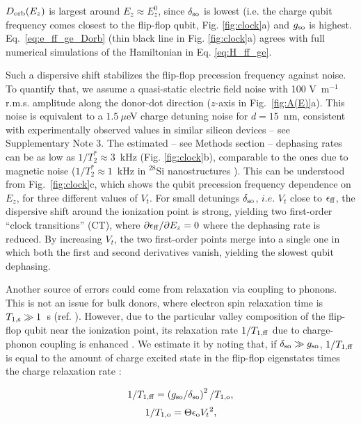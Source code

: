 \documentclass[aps,prb,superscriptaddress,nobibnotes,preprint]{revtex4-1}%
\begin{document}
$D_{\rm orb}(E_z)$ is largest around $E_z\approx E_z^0$, since $\delta_{\rm so}$ is lowest (i.e. the charge qubit frequency comes closest to the flip-flop qubit, Fig. \ref{fig:clock}a) and $g_{\rm so}$ is highest. Eq.~\ref{eq:e_ff_ge_Dorb} (thin black line in Fig. \ref{fig:clock}a) agrees with full numerical simulations of the Hamiltonian in Eq. \ref{eq:H_ff_ge}. 

Such a dispersive shift stabilizes the flip-flop precession frequency against noise. To quantify that, we assume a quasi-static electric field noise with 100 V~m$^{-1}$ r.m.s. amplitude along the donor-dot direction ($z$-axis in Fig.~\ref{fig:A(E)}a). This noise is equivalent to a $1.5~\mu$eV charge detuning noise for $d=15$~nm, consistent with experimentally observed values in similar silicon devices \cite{Freeman2016,Thorgrimsson2016,Harvey-Collard2015} -- see Supplementary Note 3. The estimated -- see Methods section -- dephasing rates can be as low as $1/T_2^{\ast} \approx 3$~kHz (Fig. \ref{fig:clock}b), comparable to the ones due to magnetic noise ($1/T_2^{\ast} \approx 1$~kHz in $^{28}$Si nanostructures \cite{Muhonen2014}). This can be understood from Fig.~\ref{fig:clock}c, which shows the qubit precession frequency dependence on $E_z$, for three different values of $V_t$. For small detunings $\delta_{\rm so}$, $i.e.$ $V_t$ close to $\epsilon_{\rm ff}$, the dispersive shift around the ionization point is strong, yielding two first-order ``clock transitions'' (CT), where $\partial\epsilon_{\rm ff}/\partial E_z=0$ where the dephasing rate is reduced. By increasing $V_t$, the two first-order points merge into a single one in which both the first and second derivatives vanish, yielding the slowest qubit dephasing.

Another source of errors could come from relaxation via coupling to phonons. This is not an issue for bulk donors, where electron spin relaxation time is $T_{1,\rm s}\gg 1$~s (ref. ). However, due to the particular valley composition of the flip-flop qubit near the ionization point, its relaxation rate ${1}/{T_{1,\rm ff}}$ due to charge-phonon coupling is enhanced \cite{Boross2016}. We estimate it by noting that, if $\delta_{\rm so}\gg g_{\rm so}$, ${1}/{T_{1,\rm ff}}$ is equal to the amount of charge excited state in the flip-flop eigenstates \cite{Blais2004} times the charge relaxation rate \cite{Boross2016}:

\begin{equation}\label{eq:T1ff}
{1}/{T_{1,\rm ff}}=\left({g_{\rm so}}/{\delta_{\rm so}}\right)^2/{T_{1,\rm o}},
\end{equation}
\begin{equation}\label{eq:T1o}
{1}/{T_{1,\rm o}}=\Theta\epsilon_{\rm o}{V_t}^2,
\end{equation}
\end{document}
